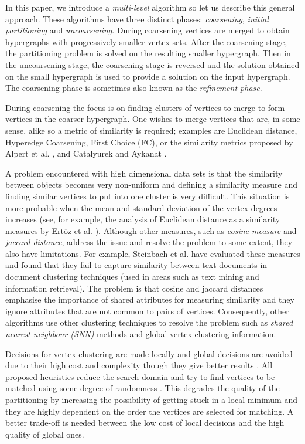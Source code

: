 \documentclass[twocolumn]{svjour3}          \smartqed
\begin{document}
In this paper, we introduce a \textit{multi-level} algorithm so let us describe this general approach.  These algorithms have three distinct phases: \textit{coarsening}, \textit{initial partitioning} and \textit{uncoarsening}. During coarsening vertices are merged to obtain hypergraphs with progressively smaller vertex sets. After the coarsening stage, the partitioning problem is solved on the resulting smaller hypergraph. Then in the uncoarsening stage, the coarsening stage is reversed and the solution obtained on the small hypergraph is used to provide a solution on the input hypergraph. The coarsening phase is sometimes also known as the \textit{refinement phase}.

During coarsening the focus is on finding clusters of vertices to merge to form vertices in the coarser hypergraph.  One wishes to merge vertices that are, in some sense, alike so a metric of similarity is required; examples are Euclidean distance, Hyperedge Coarsening, First Choice (FC), or the similarity metrics proposed by Alpert et al. \cite{alpert1998multilevel}, and Catalyurek and Aykanat \cite{catayk1999}. 

A problem encountered with high dimensional data sets is that the similarity between objects becomes very non-uniform and defining a similarity measure and finding similar vertices to put into one cluster is very difficult.  This situation is more probable when the mean and standard deviation of the vertex degrees increases (see, for example, the analysis of {Euclidean distance} as a similarity measures by Ert{\"o}z et al. \cite{ertozetal2003}).  Although other measures, such as \textit{cosine measure} and \textit{jaccard distance}, address the issue and resolve the problem to some extent, they also have limitations. For example, Steinbach et al. \cite{steinbach2000} have evaluated these measures and found that they fail to capture similarity between text documents in document clustering techniques (used in areas such as text mining and information retrieval). The problem is that cosine and jaccard distances emphasise the importance of shared attributes for measuring similarity and they ignore attributes that are not common to pairs of vertices. Consequently, other algorithms use other clustering techniques to resolve the problem such as \textit{shared nearest neighbour (SNN)} methods \cite{ertoz2002new} and global vertex clustering information. 

Decisions for vertex clustering are made locally and global decisions are avoided due to their high cost and complexity though they give better results \cite{ale2006}. All proposed heuristics reduce the search domain and try to find vertices to be matched using some degree of randomness \cite{devetal2006}. This degrades the quality of the partitioning by increasing the possibility of getting stuck in a local minimum and they are highly dependent on the order the vertices are selected for matching. A better trade-off is needed between the low cost of local decisions and the high quality of global ones.
\end{document}
